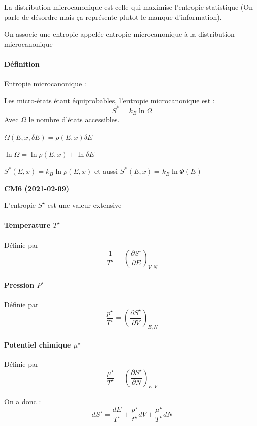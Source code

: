 \documentclass[12pt,a4paper]{report}
\begin{document}
La distribution microcanonique est celle qui maximise l'entropie statistique (On parle de désordre mais ça représente plutot le manque d'information).

On associe une entropie appelée entropie microcanonique à la distribution microcanonique

\paragraph{Définition} Entropie microcanonique :

Les micro-états étant équiprobables, l'entropie microcanonique est :
\[
	S^* = k_B \ln \Omega
\]
Avec \(\Omega\) le nombre d'états accessibles.

\(\Omega(E,x, \delta	E )= \rho(E, x)\delta E \)

\(\ln \Omega = \ln \rho(E,x) + \ln \delta E\)

\(S^* (E,x) = k_B \ln \rho(E,x)\) et aussi \(S^* (E,x) = k_B \ln \Phi(E)\)

\begin{center}
\textbf{CM6 (2021-02-09)}
\end{center}

L'entropie \(S^\star\) est une valeur extensive

\paragraph{Temperature \(T^\star\)}

Définie par 
\[
	\dfrac{1}{T^\star} = \left( \dfrac{\partial S^\star}{\partial E}\right)_{V,N}
\]

\paragraph{Pression \(P^\star\)}

Définie par
\[
	\dfrac{p^\star}{T^\star} = \left( \dfrac{\partial S^\star}{\partial V}\right)_{E,N}
\]

\paragraph{Potentiel chimique \(\mu^\star\)}

Définie par
\[
	\dfrac{\mu^\star}{T^\star} = \left( \dfrac{\partial S^\star}{\partial N}\right)_{E,V}
\]

On a donc :
\[
	dS^\star = \dfrac{dE}{T^\star} + \dfrac{p^\star}{t^\star}dV + \dfrac{\mu^\star}{T^\star}dN
\]
\end{document}
